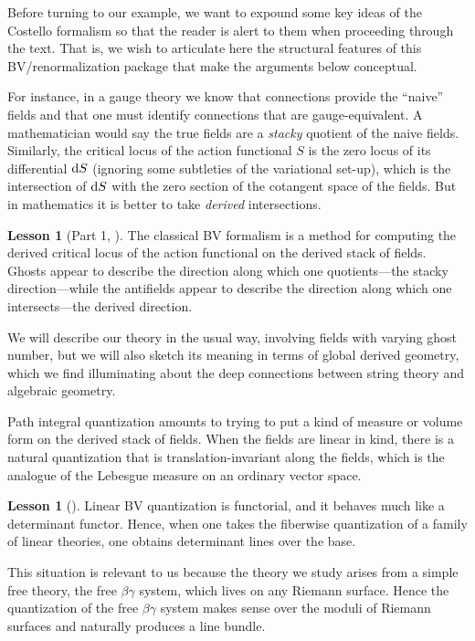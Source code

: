 Before turning to our example,
we want to expound some key ideas of the Costello formalism so that the reader is alert to them when proceeding through the text.
That is, we wish to articulate here the structural features of this BV/renormalization package that make the arguments below conceptual.

\theoremstyle{definition}
\newtheorem{lesson}[thm]{Lesson}

For instance, in a gauge theory we know that connections provide the ``naive'' fields and that one must identify connections that are gauge-equivalent.
A mathematician would say the true fields are a {\em stacky} quotient of the naive fields.
Similarly, the critical locus of the action functional $S$ is the zero locus of its differential ${\rm d} S$ (ignoring some subtleties of the variational set-up),
which is the intersection of ${\rm d} S$ with the zero section of the cotangent space of the fields.
But in mathematics it is better to take {\em derived} intersections.

\begin{lesson}[Part 1, \cite{CG2}]
The classical BV formalism is a method for computing the derived critical locus of the action functional on the derived stack of fields.
Ghosts appear to describe the direction along which one quotients---the stacky direction---while the antifields appear to describe the direction along which one intersects---the derived direction.
\end{lesson}

We will describe our theory in the usual way, involving fields with varying ghost number, 
but we will also sketch its meaning in terms of global derived geometry,
which we find illuminating about the deep connections between string theory and algebraic geometry.

Path integral quantization amounts to trying to put a kind of measure or volume form on the derived stack of fields.
When the fields are linear in kind, 
there is a natural quantization that is translation-invariant along the fields,
which is the analogue of the Lebesgue measure on an ordinary vector space.

\begin{lesson}[\cite{GH}]
Linear BV quantization is functorial, and it behaves much like a determinant functor.
Hence, when one takes the fiberwise quantization of a family of linear theories,
one obtains determinant lines over the base.
\end{lesson}

This situation is relevant to us because the theory we study arises from a simple free theory,
the free $\beta\gamma$ system, which lives on any Riemann surface.
Hence the quantization of the free $\beta\gamma$ system makes sense over the moduli of Riemann surfaces and naturally produces a line bundle.

